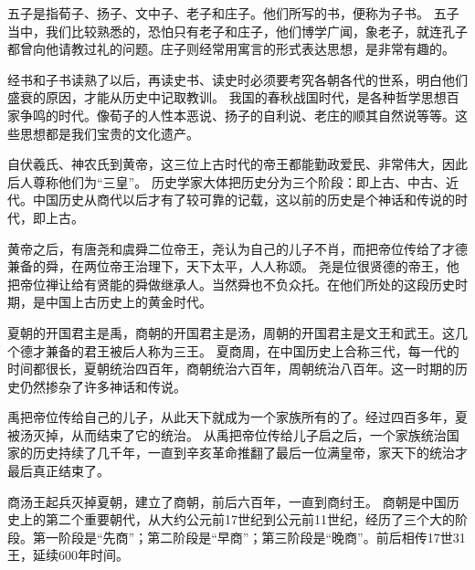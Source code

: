 \documentclass[avery5371,grid]{flashcards}
\begin{document}
{五子是指荀子、扬子、文中子、老子和庄子。他们所写的书，便称为子书。} %
{五子当中，我们比较熟悉的，恐怕只有老子和庄子，他们博学广闻，象老子，就连孔子都曾向他请教过礼的问题。庄子则经常用寓言的形式表达思想，是非常有趣的。} %


{经书和子书读熟了以后，再读史书、读史时必须要考究各朝各代的世系，明白他们盛衰的原因，才能从历史中记取教训。} %
{我国的春秋战国时代，是各种哲学思想百家争鸣的时代。像荀子的人性本恶说、扬子的自利说、老庄的顺其自然说等等。这些思想都是我们宝贵的文化遗产。} %

{自伏羲氏、神农氏到黄帝，这三位上古时代的帝王都能勤政爱民、非常伟大，因此后人尊称他们为“三皇”。} %
{历史学家大体把历史分为三个阶段：即上古、中古、近代。中国历史从商代以后才有了较可靠的记载，这以前的历史是个神话和传说的时代，即上古。} %

{黄帝之后，有唐尧和虞舜二位帝王，尧认为自己的儿子不肖，而把帝位传给了才德兼备的舜，在两位帝王治理下，天下太平，人人称颂。} %
{尧是位很贤德的帝王，他把帝位禅让给有贤能的舜做继承人。当然舜也不负众托。在他们所处的这段历史时期，是中国上古历史上的黄金时代。} %

{夏朝的开国君主是禹，商朝的开国君主是汤，周朝的开国君主是文王和武王。这几个德才兼备的君王被后人称为三王。} %
{夏商周，在中国历史上合称三代，每一代的时间都很长，夏朝统治四百年，商朝统治六百年，周朝统治八百年。这一时期的历史仍然掺杂了许多神话和传说。} %

{禹把帝位传给自己的儿子，从此天下就成为一个家族所有的了。经过四百多年，夏被汤灭掉，从而结束了它的统治。} %
{从禹把帝位传给儿子启之后，一个家族统治国家的历史持续了几千年，一直到辛亥革命推翻了最后一位满皇帝，家天下的统治才最后真正结束了。} %

{商汤王起兵灭掉夏朝，建立了商朝，前后六百年，一直到商纣王。} %
{商朝是中国历史上的第二个重要朝代，从大约公元前17世纪到公元前11世纪，经历了三个大的阶段。第一阶段是“先商”；第二阶段是“早商”；第三阶段是“晚商”。前后相传17世31王，延续600年时间。} %
\end{document}
